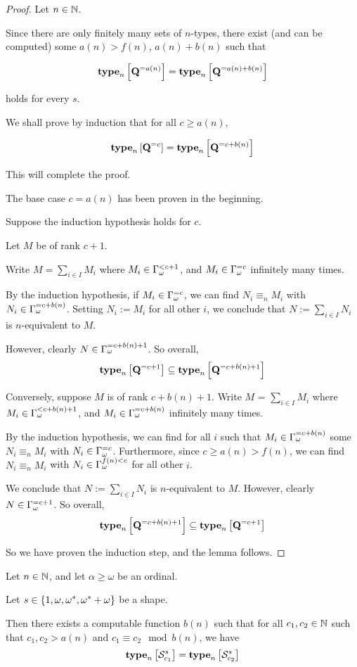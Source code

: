 \begin{proof}
    Let $n \in \mathbb{N}$.

    Since there are only finitely many sets of $n$-types,
    there exist (and can be computed)
    some $a(n) > f(n)$, $a(n) + b(n)$ such that

    \[\mathbf{type}_{n} \left[ {\mathbf{Q}^{= a(n)}} \right] = \mathbf{type}_{n} \left[ {\mathbf{Q}^{= a(n) + b(n)}} \right]\]

    holds for every $s$.

    We shall prove by induction that for all $c \ge a(n)$,

    \[\mathbf{type}_{n} \left[ {\mathbf{Q}^{= c}} \right] = \mathbf{type}_{n} \left[ {\mathbf{Q}^{= c + b(n)}} \right]\]

    This will complete the proof.

    The base case $c = a(n)$ has been proven in the beginning.

    Suppose the induction hypothesis holds for $c$.

    Let $M$ be of rank $c + 1$.

    Write $M = \sum_{i \in I} M_i$ where $M_i \in \Gamma_{\omega}^{< c + 1}$,
    and $M_i \in \Gamma_{\omega}^{= c}$ infinitely many times.

    By the induction hypothesis,
    if $M_i \in \Gamma_{\omega}^{= c}$, we can find $N_i \equiv_n M_i$ with $N_i \in \Gamma_{\omega}^{= c + b(n)}$.
    Setting $N_i := M_i$ for all other $i$, we conclude that $N := \sum_{i \in I} N_i$
    is $n$-equivalent to $M$.

    However, clearly $N \in \Gamma_{\omega}^{= c + b(n) + 1}$. So overall,
    \[\mathbf{type}_{n} \left[ {\mathbf{Q}^{= c + 1}} \right] \subseteq \mathbf{type}_{n} \left[ {\mathbf{Q}^{= c + b(n) + 1}} \right]\]

    Conversely, suppose $M$ is of rank $c + b(n) + 1$.
    Write $M$ = $\sum_{i \in I} M_i$ where $M_i \in \Gamma_{\omega}^{< c + b(n) + 1}$,
    and $M_i \in \Gamma_{\omega}^{= c + b(n)}$ infinitely many times.

    By the induction hypothesis,
    we can find for all $i$ such that $M_i \in \Gamma_{\omega}^{= c + b(n)}$ some
    $N_i \equiv_n M_i$ with $N_i \in \Gamma_{\omega}^{= c}$.
    Furthermore, since $c \ge a(n) > f(n)$, we can
    find $N_i \equiv_n M_i$ with $N_i \in \Gamma_{\omega}^{f(n) < c}$ for all other $i$.

    We conclude that $N := \sum_{i \in I} N_i$ is $n$-equivalent to $M$.
    However, clearly $N \in \Gamma_{\omega}^{= c + 1}$. So overall,
    \[\mathbf{type}_{n} \left[ {\mathbf{Q}^{= c + b(n) + 1}} \right] \subseteq \mathbf{type}_{n} \left[ {\mathbf{Q}^{= c + 1}} \right]\]

    So we have proven the induction step, and the lemma follows.
\end{proof}

\begin{corollary}
    Let $n \in \mathbb{N}$, and let $\alpha \ge \omega$ be an ordinal.

    Let $s \in \left\{ {1, \omega, \omega^\ast, \omega^\ast + \omega} \right\}$ be a shape.

    Then there exists a computable function $b(n)$ such that
    for all $c_1, c_2 \in \mathbb{N}$ such that $c_1, c_2 > a(n)$ and $c_1 \equiv c_2 \mod b(n)$,
    we have
    \[\mathbf{type}_{n} \left[ {\mathcal{S}^{s}_{c_1}} \right] = \mathbf{type}_{n} \left[ {\mathcal{S}^{s}_{c_2}} \right]\]
\end{corollary}

